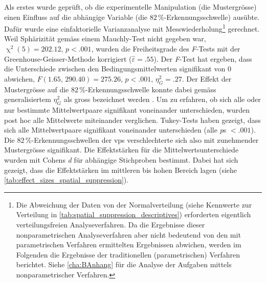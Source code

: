 \documentclass[11pt, twoside, a4paper]{book}		%
\begin{document}
Als erstes wurde geprüft, ob die experimentelle Manipulation (die Mustergrösse) einen Einfluss auf die abhängige Variable (die $82\,\%$-Er\-ken\-nungs\-schwel\-le) ausübte. Dafür wurde eine einfaktorielle Varianzanalyse mit Messwiederholung\footnote{Die Abweichung der Daten von der Normalverteilung (siehe Kennwerte zur Verteilung in \autoref{tab:spatial_suppression_descriptives}) erforderten eigentlich verteilungsfreien Analyseverfahren. Da die Ergebnisse dieser nonparametrischen Analyseverfahren aber nicht bedeutend von den mit parametrischen Verfahren ermittelten Ergebnissen abwichen, werden im Folgenden die Ergebnisse der traditionellen (parametrischen) Verfahren berichtet. Siehe \autoref{cha:BAnhang} für die Analyse der Aufgaben mittels nonparametrischer Verfahren.}
gerechnet. Weil Sphärizität gemäss einem Mauchly-Test nicht gegeben war, $\upchi^2(5)=202.12$, $p<.001$, wurden die Freiheitsgrade des \textit{F}-Tests mit der Greenhouse-Geisser-Methode korrigiert ($\hat{\varepsilon}=.55$).
Der \textit{F}-Test hat ergeben, dass die Unterschiede zwischen den Bedingungsmittelwerten signifikant von 0 abwichen, $F(1.65,\,290.40)=275.26$, $p<.001$, $\eta_{G}^2=.27$. Der Effekt der Mustergrösse auf die $82\,\%$-Erkennungsschwelle konnte dabei gemäss generalisiertem $\eta_{G}^2$ \citep{Olejnik2003} als gross bezeichnet werden \citep[S. 383]{Bakeman2005}.
Um zu erfahren, ob sich alle oder nur bestimmte Mittelwertpaare signifikant voneinander unterschieden, wurden post hoc alle Mittelwerte miteinander verglichen.
Tukey-Tests haben gezeigt, dass sich alle Mittelwertpaare signifikant voneinander unterschieden (alle \textit{p}s $<.001$).
Die $82\,\%$-Er\-ken\-nungs\-schwel\-len der \glspl{vp} verschlechterte sich also mit zunehmender Mustergrösse signifikant.
Die Effektstärken für die Mittelwertsunterschiede wurden mit Cohens \textit{d} für abhängige Stichproben \citep{Gibbons1993} bestimmt. 
Dabei hat sich gezeigt, dass die Effektstärken im mittleren bis hohen Bereich \citep[][S. 40]{Cohen1988} lagen (siehe \autoref{tab:effect_sizes_spatial_suppression}). 
\end{document}
